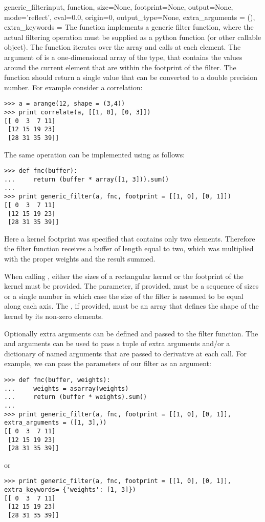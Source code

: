 \begin{funcdesc}{generic_filter}{input, function, size=None,
  footprint=None, output=None, mode='reflect', cval=0.0, origin=0, 
  output_type=None, extra_arguments = (), extra_keywords = {}}
  The  function implements a generic filter  
  function,  where the actual filtering operation must be supplied as a 
  python function (or other callable object). The  
  function iterates over the array and calls  at each 
  element. The argument of  is a one-dimensional array of the 
   type, that contains the values around the current
  element that are within the footprint of the filter. The function should 
  return a single value that can be converted to a double precision 
  number. For example consider a correlation:

\begin{verbatim}
>>> a = arange(12, shape = (3,4))
>>> print correlate(a, [[1, 0], [0, 3]])
[[ 0  3  7 11]
 [12 15 19 23]
 [28 31 35 39]]
\end{verbatim}
The same operation can be implemented using  as 
follows:
\begin{verbatim} 
>>> def fnc(buffer): 
...     return (buffer * array([1, 3])).sum()
... 
>>> print generic_filter(a, fnc, footprint = [[1, 0], [0, 1]])
[[ 0  3  7 11]
 [12 15 19 23]
 [28 31 35 39]]
\end{verbatim}
  Here a kernel footprint was specified that contains only two elements.
  Therefore the filter function receives a buffer of length equal to two,
  which was multiplied with the proper weights and the result summed.

  When calling , either the sizes of a rectangular 
  kernel or the footprint of the kernel must be provided. The  
  parameter, if provided, must be a sequence of sizes or a single number in 
  which case the size of the filter is assumed to be equal along each axis. 
  The , if provided, must be an array that defines the shape 
  of the kernel by its non-zero elements.

  Optionally extra arguments can be defined and passed to the filter 
  function. The  and  arguments 
  can be used to pass a tuple of extra arguments and/or a dictionary of 
  named arguments that are passed to derivative at each call. For example, 
  we can pass the parameters of our filter as an argument:
\begin{verbatim} 
>>> def fnc(buffer, weights): 
...     weights = asarray(weights)
...     return (buffer * weights).sum()
... 
>>> print generic_filter(a, fnc, footprint = [[1, 0], [0, 1]], extra_arguments = ([1, 3],))
[[ 0  3  7 11]
 [12 15 19 23]
 [28 31 35 39]]
\end{verbatim}
or
\begin{verbatim} 
>>> print generic_filter(a, fnc, footprint = [[1, 0], [0, 1]], extra_keywords= {'weights': [1, 3]})
[[ 0  3  7 11]
 [12 15 19 23]
 [28 31 35 39]]
\end{verbatim}
\end{funcdesc}

